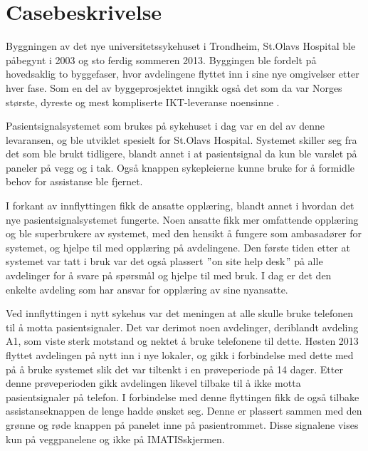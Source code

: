 \chapter{Casebeskrivelse}
\label{chp:case}
Byggningen av det nye universitetssykehuset i Trondheim, St.Olavs Hospital ble påbegynt i 2003 og sto ferdig sommeren 2013. Byggingen ble fordelt på hovedsaklig to byggefaser, hvor avdelingene flyttet inn i sine nye omgivelser etter hver fase. Som en del av byggeprosjektet inngikk også det som da var Norges største, dyreste og mest kompliserte IKT-leveranse noensinne \citep{TU}. 

\noindent
Pasientsignalsystemet som brukes på sykehuset i dag var en del av denne levaransen, og ble utviklet spesielt for St.Olavs Hospital. Systemet skiller seg fra det som ble brukt tidligere, blandt annet i at pasientsignal da kun ble varslet på paneler på vegg og i tak. Også knappen sykepleierne kunne bruke for å formidle behov for assistanse ble fjernet.

\noindent
I forkant av innflyttingen fikk de ansatte opplæring, blandt annet i hvordan det nye pasientsignalsystemet fungerte. Noen ansatte fikk mer omfattende opplæring og ble superbrukere av systemet, med den hensikt å fungere som ambasadører for systemet, og hjelpe til med opplæring på avdelingene. Den første tiden etter at systemet var tatt i bruk var det også plassert $"$on site help desk$"$ på alle avdelinger for å svare på spørsmål og hjelpe til med bruk. I dag er det den enkelte avdeling som har ansvar for opplæring av sine nyansatte. 

\noindent
Ved innflyttingen i nytt sykehus var det meningen at alle skulle bruke telefonen til å motta pasientsignaler. Det var derimot noen avdelinger, deriblandt avdeling A1, som viste sterk motstand og nektet å bruke telefonene til dette.
Høsten 2013 flyttet avdelingen på nytt inn i nye lokaler, og gikk i forbindelse med dette med på å bruke systemet slik det var tiltenkt i en prøveperiode på 14 dager. Etter denne prøveperioden gikk avdelingen likevel tilbake til å ikke motta pasientsignaler på telefon. 
I forbindelse med denne flyttingen fikk de også tilbake assistanseknappen de lenge hadde ønsket seg. Denne er plassert sammen med den grønne og røde knappen på panelet inne på pasientrommet. Disse signalene vises kun på veggpanelene og ikke på IMATISskjermen.

